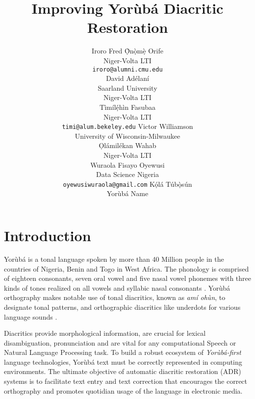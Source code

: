 \documentclass{article} %
\title{Improving Yor{\`u}b{\'a} Diacritic Restoration}
\author{Iroro Fred \d{\`O}n\d{\`o}m\d{\`e} Orife \\
Niger-Volta LTI\\
\texttt{iroro@alumni.cmu.edu} \\
\And
David Ad{\'e}lan{\'i} \\
Saarland University\\
Niger-Volta LTI \\
\And
T{\`i}m{\'i}l\d{\'{e}}h{\`i}n Fasubaa \\
Niger-Volta LTI \\
\texttt{timi@alum.bekeley.edu}
\And
Victor Williamson \\
University of Wisconsin-Milwaukee \\
\And
\d{O}l{\'a}mil{\'e}kan Wahab \\
Niger-Volta LTI \\
\And
Wuraola Fisayo Oyewusi\\
Data Science Nigeria \\
\texttt{oyewusiwuraola@gmail.com}
\And
K\d{\'{o}}l\'{a} T\'{u}b\d{\`{o}}s\'{u}n \\
Yor{\`u}b{\'a} Name \\
}
\begin{document}
\maketitle


\section{Introduction}\label{sec:introduction}

Yor{\`u}b{\'a} is a tonal language spoken by more than 40 Million people in the countries of Nigeria, Benin and Togo in West Africa. The phonology is comprised of eighteen consonants, seven oral vowel and five nasal vowel phonemes with three kinds of tones realized on all vowels and syllabic nasal consonants \citep{akinlabi2004sound}. Yor{\`u}b{\'a} orthography makes notable use of tonal diacritics, known as \emph{am{\'i} oh{\`u}n}, to designate tonal patterns, and orthographic diacritics like underdots for various language sounds \citep{adegbola2012quantifying, wells2000orthographic}.

Diacritics provide morphological information, are crucial for lexical disambiguation, pronunciation and are vital for any computational Speech or Natural Language Processing  task. To build a robust ecosystem of \emph{Yor{\`u}b{\'a}-first} language technologies, Yor{\`u}b{\'a} text must be correctly represented in computing environments. The ultimate objective of automatic diacritic restoration (ADR) systems is to facilitate text entry and text correction that encourages the correct orthography and promotes quotidian usage of the language in electronic media.
\end{document}
